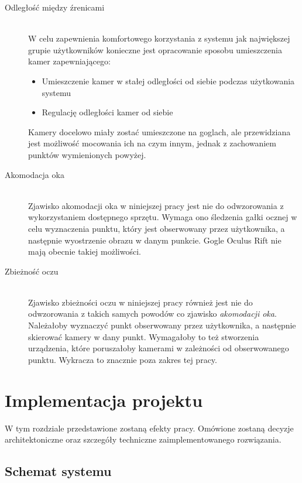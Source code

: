 \documentclass[a4paper,11pt,twoside]{report}
\theoremstyle{definition}
\begin{document}
\begin{description}

\item[Odległość między źrenicami] \hfill \\
W celu zapewnienia komfortowego korzystania z systemu jak największej grupie użytkowników konieczne jest opracowanie sposobu umieszczenia kamer zapewniającego:
\begin{itemize}
\item Umieszczenie kamer w stałej odległości od siebie podczas użytkowania systemu
\item Regulację odległości kamer od siebie
\end{itemize}

Kamery docelowo miały zostać umieszczone na goglach, ale przewidziana jest możliwość mocowania ich na czym innym, jednak z zachowaniem punktów wymienionych powyżej.

\item [Akomodacja oka] \hfill \\
Zjawisko akomodacji oka w niniejszej pracy jest nie do odwzorowania z wykorzystaniem dostępnego sprzętu. Wymaga ono śledzenia gałki ocznej w celu wyznaczenia punktu, który jest obserwowany przez użytkownika, a następnie wyostrzenie obrazu w danym punkcie. Gogle Oculus Rift nie mają obecnie takiej możliwości.

\item[Zbieżność oczu] \hfill \\
Zjawisko zbieżności oczu w niniejszej pracy również jest nie do odwzorowania z takich samych powodów co zjawisko \textit{akomodacji oka}. Należałoby wyznaczyć punkt obserwowany przez użytkownika, a następnie skierować kamery w dany punkt. Wymagałoby to też stworzenia urządzenia, które poruszałoby kamerami w zależności od obserwowanego punktu. Wykracza to znacznie poza zakres tej pracy.

\end{description}

\chapter{Implementacja projektu}

W tym rozdziale przedstawione zostaną efekty pracy. Omówione zostaną decyzje architektoniczne oraz szczegóły techniczne zaimplementowanego rozwiązania.

\section{Schemat systemu}
\end{document}
